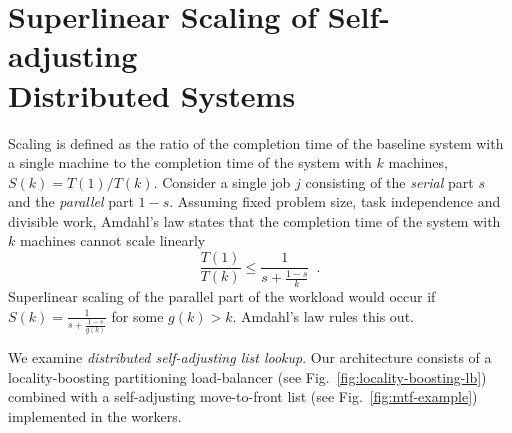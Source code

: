 \appendix













%

\section{Superlinear Scaling of Self-adjusting\\ Distributed Systems}
\label{sec:arch-scaling}


Scaling is defined as the ratio of the completion time of the baseline system with a single machine to the completion time of the system with $k$ machines, $S(k) = T(1) / T(k)$.
Consider a single job $j$ consisting of the \emph{serial} part $s$ and the \emph{parallel} part $1-s$.
Assuming fixed problem size, task independence and divisible work, Amdahl's law states that the completion time of the system with $k$ machines cannot scale linearly
\begin{equation*}\label{eq:mtf-perf}
  \frac{T(1)}{T(k)} \le \frac1{s + \frac{1-s}{k}} \enspace .
\end{equation*}
Superlinear scaling of the parallel part of the workload would occur if $S(k) = \frac1{s + \frac{1-s}{g(k)}}$ for some $g(k) > k$. Amdahl's law rules this out.


We examine \emph{distributed self-adjusting list lookup}. Our architecture consists of a locality-boosting partitioning load-balancer (see Fig.~\ref{fig:locality-boosting-lb}) combined with a self-adjusting move-to-front list (see Fig.~\ref{fig:mtf-example}) implemented in the workers.




